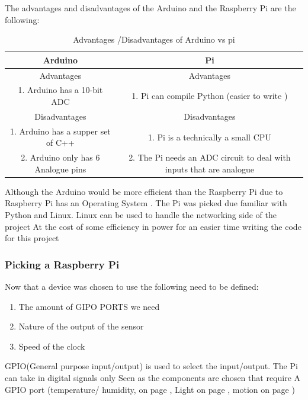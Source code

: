 The advantages and disadvantages of the Arduino and  the Raspberry Pi are the following:
\begin{table}[h!]
	\centering
	\begin{tabular}{|c|c|}
		\hline
		Arduino & Pi \\
	
	\hline \hline
	Advantages & Advantages \\
	\hline \hline
	1. Arduino has a 10-bit ADC & 1. Pi can compile Python (easier to write ) \\

	\hline \hline
	Disadvantages & Disadvantages \\
	\hline \hline
	1. Arduino has a supper set of C++ & 1. Pi is a technically a small CPU \\
	2. Arduino only has 6 Analogue pins  & 2. The Pi needs an ADC circuit to deal with inputs that are analogue \\
	
	\hline
	\end{tabular}
	\caption{Advantages /Disadvantages of Arduino vs pi}
	\label{Advantages /Disadvantages of Arduino vs pi}
\end{table}

Although the  Arduino would be more efficient than the Raspberry Pi due to Raspberry Pi has an Operating System . The Pi was picked due familiar with Python and Linux. Linux can  be used to handle the networking side  of   the project
At the cost of  some efficiency in power for an easier time writing the code for  this  project 
\subsubsection{Picking a Raspberry Pi}
Now that a device was chosen to  use the following need to be defined:
\begin{enumerate}
	\item The amount of GIPO PORTS we need 
	\item Nature of the output of the sensor
	\item Speed of the clock
\end{enumerate}	

GPIO(General purpose input/output) is used  to select the input/output. The Pi can  take in  digital signals only Seen as the components are chosen that require A GPIO port (temperature/ humidity, on page \pageref{Compareing DHT22 and DHT11}, Light on page \pageref{table of light sensors}, motion on page \pageref{Motion sensor components})

